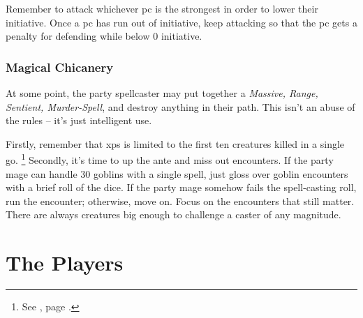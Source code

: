 \begin{multicols}{2}
Remember to attack whichever \gls{pc} is the strongest in order to lower their initiative.
Once a \gls{pc} has run out of initiative, keep attacking so that the \gls{pc} gets a penalty for defending while below 0 initiative.

\subsubsection{Magical Chicanery}

At some point, the party spellcaster may put together a \textit{Massive, Range, Sentient, Murder-Spell}, and destroy anything in their path.
This isn't an abuse of the rules -- it's just intelligent use.

Firstly, remember that \glspl{xp} is limited to the first ten creatures killed in a single go.%
\footnote{See , page \pageref{xpCreatureMax}.}
Secondly, it's time to up the ante and miss out encounters.
If the party mage can handle 30 goblins with a single spell, just gloss over goblin encounters with a brief roll of the dice.
If the party mage somehow fails the spell-casting roll, run the encounter; otherwise, move on.
Focus on the encounters that still matter.
There are always creatures big enough to challenge a caster of any magnitude.

\end{multicols}

\section{The Players}

